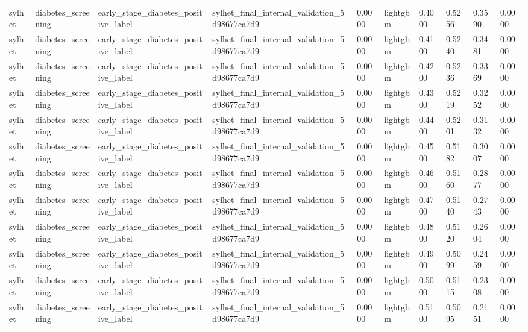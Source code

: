 \begin{tabular}{llllllllll}
sylhet & diabetes\_screening & early\_stage\_diabetes\_positive\_label & sylhet\_final\_internal\_validation\_5d98677ca7d9 & 0.0000 & lightgbm & 0.4000 & 0.5256 & 0.3590 & 0.0000 \\
sylhet & diabetes\_screening & early\_stage\_diabetes\_positive\_label & sylhet\_final\_internal\_validation\_5d98677ca7d9 & 0.0000 & lightgbm & 0.4100 & 0.5240 & 0.3481 & 0.0000 \\
sylhet & diabetes\_screening & early\_stage\_diabetes\_positive\_label & sylhet\_final\_internal\_validation\_5d98677ca7d9 & 0.0000 & lightgbm & 0.4200 & 0.5236 & 0.3369 & 0.0000 \\
sylhet & diabetes\_screening & early\_stage\_diabetes\_positive\_label & sylhet\_final\_internal\_validation\_5d98677ca7d9 & 0.0000 & lightgbm & 0.4300 & 0.5219 & 0.3252 & 0.0000 \\
sylhet & diabetes\_screening & early\_stage\_diabetes\_positive\_label & sylhet\_final\_internal\_validation\_5d98677ca7d9 & 0.0000 & lightgbm & 0.4400 & 0.5201 & 0.3132 & 0.0000 \\
sylhet & diabetes\_screening & early\_stage\_diabetes\_positive\_label & sylhet\_final\_internal\_validation\_5d98677ca7d9 & 0.0000 & lightgbm & 0.4500 & 0.5182 & 0.3007 & 0.0000 \\
sylhet & diabetes\_screening & early\_stage\_diabetes\_positive\_label & sylhet\_final\_internal\_validation\_5d98677ca7d9 & 0.0000 & lightgbm & 0.4600 & 0.5160 & 0.2877 & 0.0000 \\
sylhet & diabetes\_screening & early\_stage\_diabetes\_positive\_label & sylhet\_final\_internal\_validation\_5d98677ca7d9 & 0.0000 & lightgbm & 0.4700 & 0.5140 & 0.2743 & 0.0000 \\
sylhet & diabetes\_screening & early\_stage\_diabetes\_positive\_label & sylhet\_final\_internal\_validation\_5d98677ca7d9 & 0.0000 & lightgbm & 0.4800 & 0.5120 & 0.2604 & 0.0000 \\
sylhet & diabetes\_screening & early\_stage\_diabetes\_positive\_label & sylhet\_final\_internal\_validation\_5d98677ca7d9 & 0.0000 & lightgbm & 0.4900 & 0.5099 & 0.2459 & 0.0000 \\
sylhet & diabetes\_screening & early\_stage\_diabetes\_positive\_label & sylhet\_final\_internal\_validation\_5d98677ca7d9 & 0.0000 & lightgbm & 0.5000 & 0.5115 & 0.2308 & 0.0000 \\
sylhet & diabetes\_screening & early\_stage\_diabetes\_positive\_label & sylhet\_final\_internal\_validation\_5d98677ca7d9 & 0.0000 & lightgbm & 0.5100 & 0.5095 & 0.2151 & 0.0000 \\

\end{tabular}
